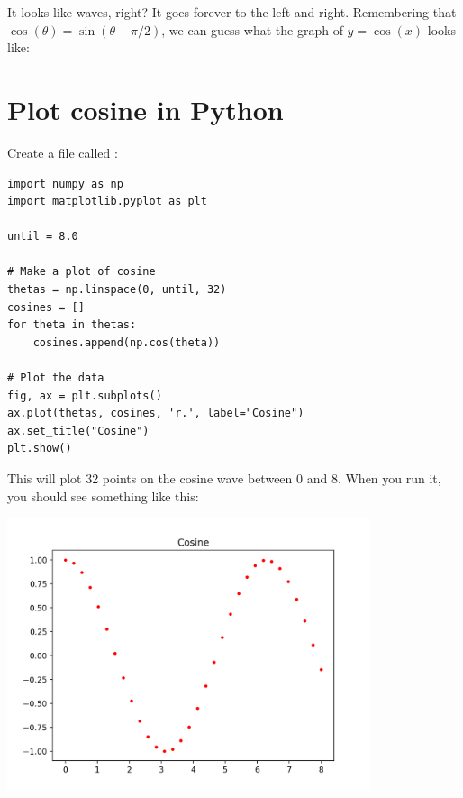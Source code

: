 It looks like waves, right? It goes forever to the left and
right. Remembering that $\cos(\theta) = \sin(\theta + \pi/2)$, we can
guess what the graph of $y = \cos(x)$ looks like:
    

\section{Plot cosine in Python}

Create a file called :

\begin{Verbatim}
import numpy as np
import matplotlib.pyplot as plt

until = 8.0

# Make a plot of cosine
thetas = np.linspace(0, until, 32)
cosines = []
for theta in thetas:
    cosines.append(np.cos(theta))

# Plot the data
fig, ax = plt.subplots()
ax.plot(thetas, cosines, 'r.', label="Cosine")
ax.set_title("Cosine")
plt.show()
\end{Verbatim}

This will plot 32 points on the cosine wave between 0 and 8. When you
run it, you should see something like this:

\includegraphics[width=0.8\textwidth]{cospy.png}

